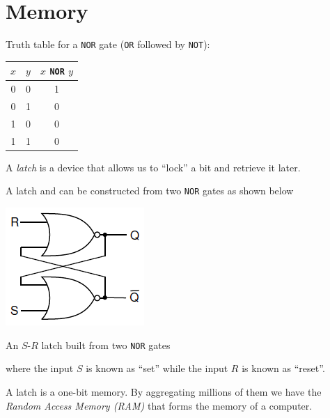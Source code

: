 \documentclass[8pt,a4paper,compress,handout]{beamer}
\begin{document}
\section{Memory}
\begin{frame}[fragile]
Truth table for a \lstinline{NOR} gate (\lstinline{OR} followed by \lstinline{NOT}):
\begin{center}
\begin{tabular}{cc|c}
$x$ & $y$ & $x$ \lstinline$NOR$ $y$ \\ \hline
0 & 0 & 1 \\
0 & 1 & 0 \\
1 & 0 & 0 \\
1 & 1 & 0
\end{tabular}
\end{center}

\bigskip

A \emph{latch} is a device that allows us to ``lock'' a bit and retrieve it later.

\bigskip

A latch and can be constructed from two \lstinline{NOR} gates as shown below
\begin{center}
\includegraphics[scale=0.4]{figures/latch.png}

\smallskip

\tiny An $S$-$R$ latch built from two \lstinline{NOR} gates
\end{center}
where the input $S$ is known as ``set'' while the input $R$ is known as ``reset''.

\bigskip

A latch is a one-bit memory. By aggregating millions of them we have the \emph{Random Access Memory (RAM)} that forms the memory of a computer.
\end{frame}
\end{document}
